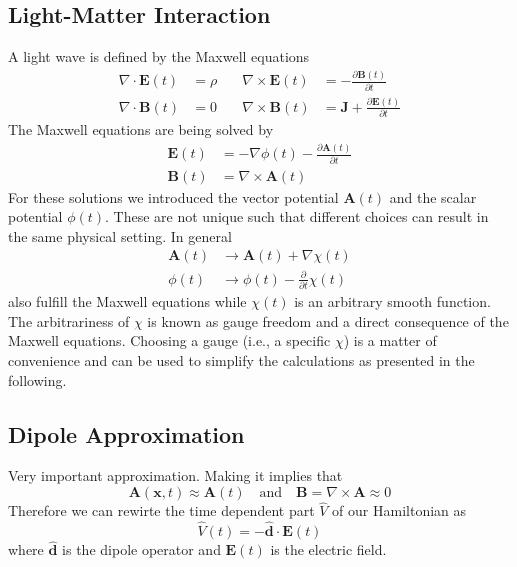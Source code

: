 \subsection{Light-Matter Interaction}
A light wave is defined by the Maxwell equations
\begin{equation*}
    \begin{aligned}
        \nabla \cdot \mathbf{E}(t) &= \rho \quad & \nabla \times \mathbf{E}(t) &= -\frac{\partial \mathbf{B}(t)}{\partial t} \\
        \nabla \cdot \mathbf{B}(t) &= 0 \quad & \nabla \times \mathbf{B}(t) &= \mathbf{J} + \frac{\partial \mathbf{E}(t)}{\partial t}
    \end{aligned}
\end{equation*}
The Maxwell equations are being solved by
\begin{equation*}
    \begin{aligned}
        \mathbf{E}(t) &= -\nabla \phi(t) - \frac{\partial \mathbf{A}(t)}{\partial t}\\
        \mathbf{B}(t) &= \nabla \times \mathbf{A}(t)
    \end{aligned}
\end{equation*}
For these solutions we introduced the vector potential $\mathbf{A}(t)$ and the scalar potential $\phi(t)$. 
These are not unique such that different choices can result in the same physical setting. In general
\begin{equation*}
    \begin{aligned}
        \mathbf{A}(t) &\to \mathbf{A}(t) + \nabla \chi(t) \\
        \phi(t) &\to \phi(t) - \frac{\partial}{\partial t} \chi(t)    
    \end{aligned}
\end{equation*}
also fulfill the Maxwell equations while $\chi(t)$ is an arbitrary smooth function. The arbitrariness of $\chi$ is known as gauge freedom and a direct consequence of the Maxwell equations.
Choosing a gauge (i.e., a specific $\chi$) is a matter of convenience and can be used to simplify the calculations as presented in the following.




\subsection{Dipole Approximation}
Very important approximation. Making it implies that
\begin{equation}
    \mathbf{A}(\mathbf{x}, t) \approx \mathbf{A}(t) \quad \text{and} \quad \mathbf{B} = \nabla \times \mathbf{A} \approx 0
\end{equation}
Therefore we can rewirte the time dependent part $\hat{V}$ of our Hamiltonian as
\begin{equation}
    \hat{V}(t) = -\hat{\mathbf{d}} \cdot \mathbf{E}(t)
\end{equation}
where $\hat{\mathbf{d}}$ is the dipole operator and $\mathbf{E}(t)$ is the electric field.




